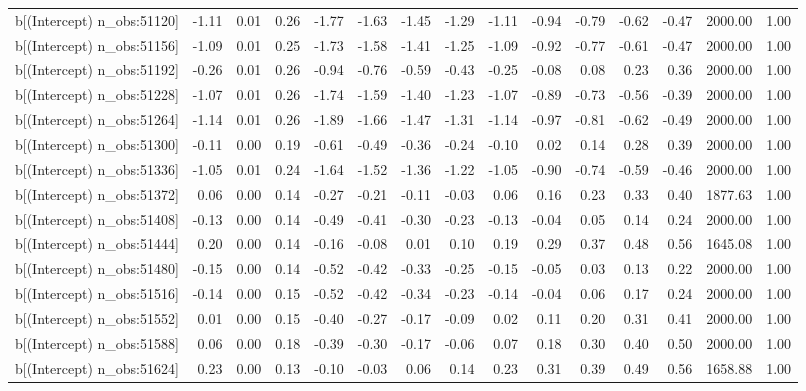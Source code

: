\begin{table}[ht]
\begin{tabular}{rrrrrrrrrrrrrrr}
  b[(Intercept) n\_obs:51120] & -1.11 & 0.01 & 0.26 & -1.77 & -1.63 & -1.45 & -1.29 & -1.11 & -0.94 & -0.79 & -0.62 & -0.47 & 2000.00 & 1.00 \\ 
  b[(Intercept) n\_obs:51156] & -1.09 & 0.01 & 0.25 & -1.73 & -1.58 & -1.41 & -1.25 & -1.09 & -0.92 & -0.77 & -0.61 & -0.47 & 2000.00 & 1.00 \\ 
  b[(Intercept) n\_obs:51192] & -0.26 & 0.01 & 0.26 & -0.94 & -0.76 & -0.59 & -0.43 & -0.25 & -0.08 & 0.08 & 0.23 & 0.36 & 2000.00 & 1.00 \\ 
  b[(Intercept) n\_obs:51228] & -1.07 & 0.01 & 0.26 & -1.74 & -1.59 & -1.40 & -1.23 & -1.07 & -0.89 & -0.73 & -0.56 & -0.39 & 2000.00 & 1.00 \\ 
  b[(Intercept) n\_obs:51264] & -1.14 & 0.01 & 0.26 & -1.89 & -1.66 & -1.47 & -1.31 & -1.14 & -0.97 & -0.81 & -0.62 & -0.49 & 2000.00 & 1.00 \\ 
  b[(Intercept) n\_obs:51300] & -0.11 & 0.00 & 0.19 & -0.61 & -0.49 & -0.36 & -0.24 & -0.10 & 0.02 & 0.14 & 0.28 & 0.39 & 2000.00 & 1.00 \\ 
  b[(Intercept) n\_obs:51336] & -1.05 & 0.01 & 0.24 & -1.64 & -1.52 & -1.36 & -1.22 & -1.05 & -0.90 & -0.74 & -0.59 & -0.46 & 2000.00 & 1.00 \\ 
  b[(Intercept) n\_obs:51372] & 0.06 & 0.00 & 0.14 & -0.27 & -0.21 & -0.11 & -0.03 & 0.06 & 0.16 & 0.23 & 0.33 & 0.40 & 1877.63 & 1.00 \\ 
  b[(Intercept) n\_obs:51408] & -0.13 & 0.00 & 0.14 & -0.49 & -0.41 & -0.30 & -0.23 & -0.13 & -0.04 & 0.05 & 0.14 & 0.24 & 2000.00 & 1.00 \\ 
  b[(Intercept) n\_obs:51444] & 0.20 & 0.00 & 0.14 & -0.16 & -0.08 & 0.01 & 0.10 & 0.19 & 0.29 & 0.37 & 0.48 & 0.56 & 1645.08 & 1.00 \\ 
  b[(Intercept) n\_obs:51480] & -0.15 & 0.00 & 0.14 & -0.52 & -0.42 & -0.33 & -0.25 & -0.15 & -0.05 & 0.03 & 0.13 & 0.22 & 2000.00 & 1.00 \\ 
  b[(Intercept) n\_obs:51516] & -0.14 & 0.00 & 0.15 & -0.52 & -0.42 & -0.34 & -0.23 & -0.14 & -0.04 & 0.06 & 0.17 & 0.24 & 2000.00 & 1.00 \\ 
  b[(Intercept) n\_obs:51552] & 0.01 & 0.00 & 0.15 & -0.40 & -0.27 & -0.17 & -0.09 & 0.02 & 0.11 & 0.20 & 0.31 & 0.41 & 2000.00 & 1.00 \\ 
  b[(Intercept) n\_obs:51588] & 0.06 & 0.00 & 0.18 & -0.39 & -0.30 & -0.17 & -0.06 & 0.07 & 0.18 & 0.30 & 0.40 & 0.50 & 2000.00 & 1.00 \\ 
  b[(Intercept) n\_obs:51624] & 0.23 & 0.00 & 0.13 & -0.10 & -0.03 & 0.06 & 0.14 & 0.23 & 0.31 & 0.39 & 0.49 & 0.56 & 1658.88 & 1.00 \\ 

\end{tabular}
\end{table}
